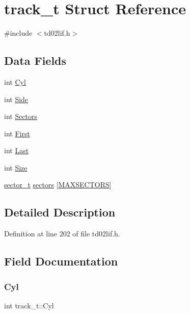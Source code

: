 \hypertarget{structtrack__t}{}\section{track\+\_\+t Struct Reference}
\label{structtrack__t}


{\ttfamily \#include $<$td02lif.\+h$>$}

\subsection*{Data Fields}
\begin{DoxyCompactItemize}
\item 
int \hyperlink{structtrack__t_ab0489765c2499c501ce16426ec2b0c86}{Cyl}
\item 
int \hyperlink{structtrack__t_ad8ed890a8194525d7162dee414180635}{Side}
\item 
int \hyperlink{structtrack__t_a9a073d98f27d50ffda7991ea8099f269}{Sectors}
\item 
int \hyperlink{structtrack__t_a1ffa3863c3fb622cb158e5275c99c55c}{First}
\item 
int \hyperlink{structtrack__t_a9ebaf56b7b9c814e5e9c39dea130fa18}{Last}
\item 
int \hyperlink{structtrack__t_ab0e996e402d1d61b694b80a1c866177e}{Size}
\item 
\hyperlink{structsector__t}{sector\+\_\+t} \hyperlink{structtrack__t_af5a5bc7c09b032d06fe21a18f08772db}{sectors} \mbox{[}\hyperlink{td02lif_8h_a39ad5a6dea9e9b9d5314d32f397fee7d}{M\+A\+X\+S\+E\+C\+T\+O\+RS}\mbox{]}
\end{DoxyCompactItemize}


\subsection{Detailed Description}


Definition at line 202 of file td02lif.\+h.



\subsection{Field Documentation}
\mbox{\label{structtrack__t_ab0489765c2499c501ce16426ec2b0c86}} 
\subsubsection{\texorpdfstring{Cyl}{Cyl}}
{\footnotesize\ttfamily int track\+\_\+t\+::\+Cyl}



